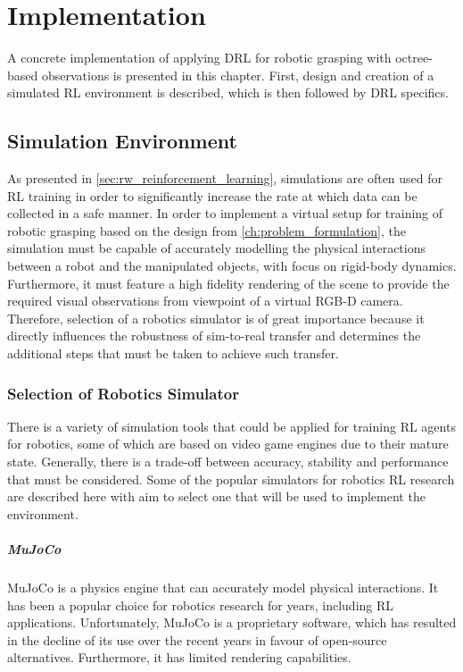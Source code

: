 \chapter{Implementation}\label{ch:implementation}

A concrete implementation of applying DRL for robotic grasping with octree-based observations is presented in this chapter. First, design and creation of a simulated RL environment is described, which is then followed by DRL specifics.


\section{Simulation Environment}

As presented in \autoref{sec:rw_reinforcement_learning}, simulations are often used for RL training in order to significantly increase the rate at which data can be collected in a safe manner. In order to implement a virtual setup for training of robotic grasping based on the design from \autoref{ch:problem_formulation}, the simulation must be capable of accurately modelling the physical interactions between a robot and the manipulated objects, with focus on rigid-body dynamics. Furthermore, it must feature a high fidelity rendering of the scene to provide the required visual observations from viewpoint of a virtual RGB-D camera. Therefore, selection of a robotics simulator is of great importance because it directly influences the robustness of sim-to-real transfer and determines the additional steps that must be taken to achieve such transfer.


\subsection{Selection of Robotics Simulator}

There is a variety of simulation tools that could be applied for training RL agents for robotics, some of which are based on video game engines due to their mature state. Generally, there is a trade-off between accuracy, stability and performance that must be considered. Some of the popular simulators for robotics RL research are described here with aim to select one that will be used to implement the environment.

\paragraph{MuJoCo~\protect\cite{todorov_mujoco_2012}} MuJoCo is a physics engine that can accurately model physical interactions. It has been a popular choice for robotics research for years, including RL applications. Unfortunately, MuJoCo is a proprietary software, which has resulted in the decline of its use over the recent years in favour of open-source alternatives. Furthermore, it has limited rendering capabilities.

